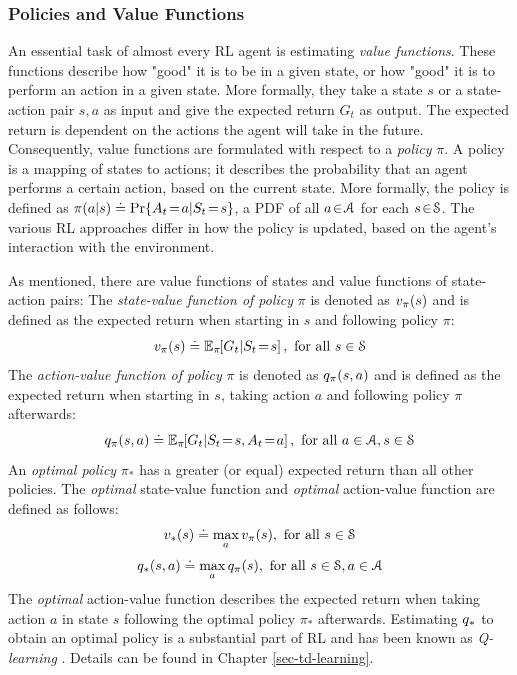 \documentclass[a4paper, twoside, 12pt]{article}
\let\cite\shortcite
\begin{document}
\subsubsection{Policies and Value Functions}
\label{sec:org7f26859}
An essential task of almost every RL agent is estimating \emph{value functions}.
These functions describe how "good" it is to be in a given state, or how "good"
it is to perform an action in a given state. More formally, they take a state
\(s\) or a state-action pair \(s,a\) as input and give the expected return \(G_t\) as
output. The expected return is dependent on the actions the agent will take in
the future. Consequently, value functions are formulated with respect to a
\emph{policy} \(\pi\). A policy is a mapping of states to actions; it describes the
probability that an agent performs a certain action, based on the current state.
More formally, the policy is defined as
\(\pi(a|s)\defeq\Pr{A_t\!=\!a|S_t\!=\!s}\), a PDF of all \(a\!\in\!\A\) for each
\(s\!\in\!\S\). The various RL approaches differ in how the policy is
updated, based on the agent's interaction with the environment.

As mentioned, there are value functions of states and value functions of
state-action pairs: The \emph{state-value function of policy} \(\pi\) is denoted as
\(\vpi(s)\) and is defined as the expected return when starting in \(s\) and
following policy \(\pi\):
\begin{equation} \label{eq-state-value}
    \vpi(s) \defeq \EE{\pi}{G_t|S_t\!=\!s}, \text{ for all } s\in\S
\end{equation}
The \emph{action-value function of policy} \(\pi\) is denoted as \(\qpi(s,a)\) and is
defined as the expected return when starting in \(s\), taking action \(a\) and
following policy \(\pi\) afterwards:
\begin{equation} \label{eq-action-value}
    \qpi(s,a) \defeq \EE{\pi}{G_t|S_t\!=\!s, A_t\!=\!a}, \text{ for all } a\in\A, s\in\S
\end{equation}
An \emph{optimal policy} \(\pi_*\) has a greater (or equal) expected return than all
other policies.  The \emph{optimal} state-value function and \emph{optimal} action-value
function are defined as follows:
\begin{equation}
    \vstar(s) \defeq \max_a \vpi(s), \text{ for all } s\in\S
\end{equation}
\begin{equation}
    \qstar(s,a) \defeq \max_a \qpi(s), \text{ for all } s\in\S, a\in\A
\end{equation}
The \emph{optimal} action-value function describes the expected return when taking
action \(a\) in state \(s\) following the optimal policy \(\pi_*\) afterwards.
Estimating \(\qstar\) to obtain an optimal policy is a substantial part of RL and
has been known as \emph{Q-learning} \cite{watkins92_q_learn}. Details can be found in
Chapter \ref{sec-td-learning}.
\end{document}
